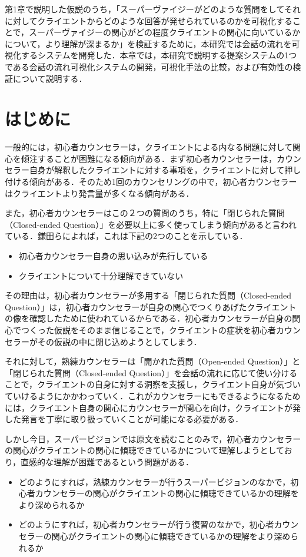 \documentclass[shuuron]{kuee}
\begin{document}
第1章で説明した仮説のうち，「スーパーヴァイジーがどのような質問をしてそれに対してクライエントからどのような回答が発せられているのかを可視化することで，スーパーヴァイジーの関心がどの程度クライエントの関心に向いているかについて，より理解が深まるか」を検証するために，本研究では会話の流れを可視化するシステムを開発した．本章では，本研究で説明する提案システムの1つである会話の流れ可視化システムの開発，可視化手法の比較，および有効性の検証について説明する．
\section{はじめに}%





一般的には，初心者カウンセラーは，クライエントによる内なる問題に対して関心を傾注することが困難になる傾向がある．まず初心者カウンセラーは，カウンセラー自身が解釈したクライエントに対する事項を，クライエントに対して押し付ける傾向がある．そのため1回のカウンセリングの中で，初心者カウンセラーはクライエントより発言量が多くなる傾向がある．

また，初心者カウンセラーはこの２つの質問のうち，特に「閉じられた質問（Closed-ended Question）」を必要以上に多く使ってしまう傾向があると言われている．鎌田ら\cite{Darshana}によれば，これは下記の2つのことを示している．
\begin{itemize}
  \item 初心者カウンセラー自身の思い込みが先行している
  \item クライエントについて十分理解できていない
\end{itemize}
その理由は，初心者カウンセラーが多用する「閉じられた質問（Closed-ended Question）」は，初心者カウンセラーが自身の関心でつくりあげたクライエントの像を確認したために使われているからである．初心者カウンセラーが自身の関心でつくった仮説をそのまま信じることで，クライエントの症状を初心者カウンセラーがその仮説の中に閉じ込めようとしてしまう．

それに対して，熟練カウンセラーは「開かれた質問（Open-ended Question）」と「閉じられた質問（Closed-ended Question）」を会話の流れに応じて使い分けることで，クライエントの自身に対する洞察を支援し，クライエント自身が気づいていけるようにかかわっていく．これがカウンセラーにもできるようになるためには，クライエント自身の関心にカウンセラーが関心を向け，クライエントが発した発言を丁寧に取り扱っていくことが可能になる必要がある．

しかし今日，スーパービジョンでは原文を読むことのみで，初心者カウンセラーの関心がクライエントの関心に傾聴できているかについて理解しようとしており，直感的な理解が困難であるという問題がある．
\begin{itemize}
  \item どのようにすれば，熟練カウンセラーが行うスーパービジョンのなかで，初心者カウンセラーの関心がクライエントの関心に傾聴できているかの理解をより深められるか
  \item どのようにすれば，初心者カウンセラーが行う復習のなかで，初心者カウンセラーの関心がクライエントの関心に傾聴できているかの理解をより深められるか
\end{itemize}
\end{document}
